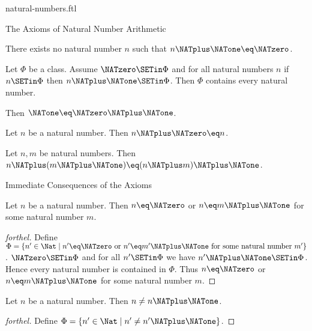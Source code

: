 \documentclass{naproche-library}
\begin{document}
\begin{smodule}[title=Natural Numbers]{natural-numbers.ftl}
\begin{sfragment}{The Axioms of Natural Number Arithmetic}
  \begin{axiom}[forthel,id=ARITHMETIC_01_4454289938317312]
    There exists no natural number $n$ such that $n \NATplus \NATone \eq \NATzero$.
  \end{axiom}

  \begin{axiom}[forthel,title=Induction,id=ARITHMETIC_01_4764664342773760]
    Let $\Phi$ be a class.
    Assume $\NATzero \SETin \Phi$ and for all natural numbers $n$ if $n \SETin \Phi$ then
    $n \NATplus \NATone \SETin \Phi$.
    Then $\Phi$ contains every natural number.
  \end{axiom}

  \begin{axiom}[forthel,id=ARITHMETIC_03_5962332515874540]
    Then $\NATone \eq \NATzero \NATplus \NATone$.
  \end{axiom}

  \begin{axiom}[forthel,id=ARITHMETIC_03_4827955356237824]
    Let $n$ be a natural number.
    Then $n \NATplus \NATzero \eq n$.
  \end{axiom}

  \begin{axiom}[forthel,id=ARITHMETIC_03_4427935386238924]
    Let $n, m$ be natural numbers.
    Then $n \NATplus (m \NATplus \NATone) \eq (n \NATplus m) \NATplus \NATone$.
  \end{axiom}
\end{sfragment}

\begin{sfragment}{Immediate Consequences of the Axioms}
  \begin{proposition}[forthel,id=ARITHMETIC_01_4966080109871104]
    Let $n$ be a natural number.
    Then $n \eq \NATzero$ or $n \eq m \NATplus \NATone$ for some natural number $m$.
  \end{proposition}
  \begin{proof}[forthel]
    Define $\Phi = \{ n' \in \Nat \mid n' \eq \NATzero\text{ or }n' \eq m' \NATplus \NATone\text{ for some natural number }m' \}$.
    $\NATzero \SETin \Phi$ and for all $n' \SETin  \Phi$ we have $n' \NATplus \NATone \SETin \Phi$.
    Hence every natural number is contained in $\Phi$.
    Thus $n \eq \NATzero$ or $n \eq m \NATplus \NATone$ for some natural number $m$.
  \end{proof}

  \begin{proposition}[forthel,id=ARITHMETIC_01_5996049267163136]
    Let $n$ be a natural number.
    Then $n \neq n \NATplus \NATone$.
  \end{proposition}
  \begin{proof}[forthel]
    Define $\Phi = \{ n' \in \Nat \mid n' \neq n' \NATplus \NATone \}$.


\end{proof}
\end{sfragment}
\end{smodule}
\end{document}
